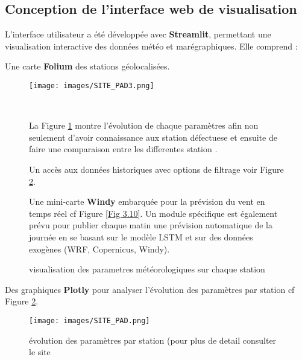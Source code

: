 \documentclass[a4paper,12pt,openany]{report}
\begin{document}
\subsection{Conception de l’interface web de visualisation}
L’interface utilisateur a été développée avec \textbf{Streamlit}, permettant une visualisation interactive des données météo et marégraphiques. Elle comprend :
\begin{enumerate}
	\item Une carte \textbf{Folium} des stations géolocalisées.
	
	\begin{figure}[H]
		\begin{center}
		 \begin{minipage}{\textwidth}
		 	
		    \begin{center}
		    \texttt{[image: images/SITE\_PAD3.png]}
		    \caption{visualisation des parametres météorologiques sur chaque station \label{Fig 3.7} }
		    \end{center}
		    \end{minipage}	\\
		    	
			\quad
			
			\centering
		La Figure \ref{Fig 3.7}  montre l'évolution de chaque paramètres  afin non seulement d'avoir connaissance aux station défectuese et ensuite de faire une comparaison entre les differentes station .
		\item Un accès aux données historiques avec options de filtrage voir Figure \ref{Fig 3.8}.
		\item Une mini-carte \textbf{Windy} embarquée pour la prévision du vent en temps réel cf Figure \ref{Fig 3.10}.
		Un module spécifique est également prévu pour publier chaque matin une prévision automatique de la journée en se basant sur le modèle LSTM et sur des données exogènes (WRF, Copernicus, Windy).
			
		\end{center}
	\end{figure}%
	\item Des graphiques \textbf{Plotly} pour analyser l’évolution des paramètres par station cf Figure \ref{Fig 3.8}.
	
	\begin{figure}[H]
		\begin{center}
		 \begin{minipage}{\textwidth}
		    \begin{center}
		    \texttt{[image: images/SITE\_PAD.png]}
		    \end{center}
		    \end{minipage}
			\caption{évolution des paramètres par station (pour plus de detail consulter le site \label{Fig 3.8}}
		\end{center}
	\end{figure}%
	


\end{enumerate}
\end{document}
